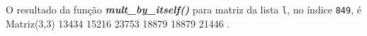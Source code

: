 \documentclass[12pt,varwidth=16cm,border=1pt]{standalone}
\begin{document}
O resultado da função \textbf{\textit{mult\_by\_itself()}} para matriz da lista \verb+l+, no índice \verb+849+, é \newline Matriz(3,3)
  13434 15216 
  23753 18879 
  18879 21446 .

\questiomtrue
\end{document}
